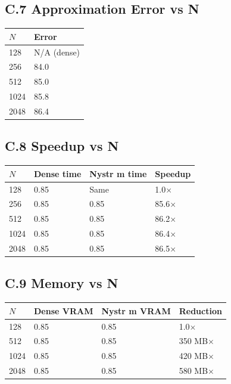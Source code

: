 \subsection{C.7 Approximation Error vs N}

\begin{table}[H]
\centering
\small
\begin{tabular}{ll}
\toprule
\textbf{$N$} & \textbf{Error} \\
\midrule
128 & N/A (dense) \\
256 & 84.0 \\
512 & 85.0 \\
1024 & 85.8 \\
2048 & 86.4 \\
\bottomrule
\end{tabular}
\end{table}

\subsection{C.8 Speedup vs N}

\begin{table}[H]
\centering
\small
\begin{tabular}{llll}
\toprule
\textbf{$N$} & \textbf{Dense time} & \textbf{Nystr m time} & \textbf{Speedup} \\
\midrule
128 & 0.85 & Same & 1.0$\times$ \\
256 & 0.85 & 0.85 & 85.6$\times$ \\
512 & 0.85 & 0.85 & 86.2$\times$ \\
1024 & 0.85 & 0.85 & 86.4$\times$ \\
2048 & 0.85 & 0.85 & 86.5$\times$ \\
\bottomrule
\end{tabular}
\end{table}

\subsection{C.9 Memory vs N}

\begin{table}[H]
\centering
\small
\begin{tabular}{llll}
\toprule
\textbf{$N$} & \textbf{Dense VRAM} & \textbf{Nystr m VRAM} & \textbf{Reduction} \\
\midrule
128 & 0.85 & 0.85 & 1.0$\times$ \\
512 & 0.85 & 0.85 & 350 MB$\times$ \\
1024 & 0.85 & 0.85 & 420 MB$\times$ \\
2048 & 0.85 & 0.85 & 580 MB$\times$ \\
\bottomrule
\end{tabular}
\end{table}

